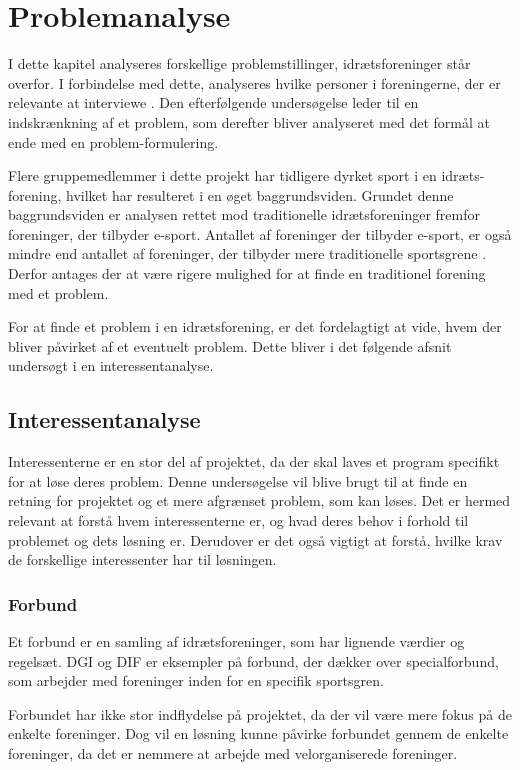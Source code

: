 \chapter{Problemanalyse}\label{ch:ch2label}
I dette kapitel analyseres forskellige problemstillinger, idrætsforeninger står overfor. I forbindelse med dette, analyseres hvilke personer i foreningerne, der er relevante at interviewe . Den efterfølgende undersøgelse leder til en indskrænkning af et problem, som derefter bliver analyseret med det formål at ende med en problem-formulering.
\par
Flere gruppemedlemmer i dette projekt har tidligere dyrket sport i en idræts-forening, hvilket har resulteret i en øget baggrundsviden. Grundet denne baggrundsviden er analysen rettet mod traditionelle idrætsforeninger fremfor foreninger, der tilbyder e-sport. Antallet af foreninger der tilbyder e-sport, er også mindre end antallet af foreninger, der tilbyder mere traditionelle sportsgrene \citep{e-sport}. Derfor antages der at være rigere mulighed for at finde en traditionel forening med et problem.
\par
For at finde et problem i en idrætsforening, er det fordelagtigt at vide, hvem der bliver påvirket af et eventuelt problem. Dette bliver i det følgende afsnit undersøgt i en interessentanalyse.
\newpage

\section{Interessentanalyse}
Interessenterne er en stor del af projektet, da der skal laves et program specifikt for at løse deres problem. Denne undersøgelse vil blive brugt til at finde en retning for projektet og et mere afgrænset problem, som kan løses. Det er hermed relevant at forstå hvem interessenterne er, og hvad deres behov i forhold til problemet og dets løsning er. Derudover er det også vigtigt at forstå, hvilke krav de forskellige interessenter har til løsningen.

\subsection*{Forbund}
Et forbund er en samling af idrætsforeninger, som har lignende værdier og regelsæt. DGI og DIF er eksempler på forbund, der dækker over specialforbund, som arbejder med foreninger inden for en specifik sportsgren.
\par
Forbundet har ikke stor indflydelse på projektet, da der vil være mere fokus på de enkelte foreninger. Dog vil en løsning kunne påvirke forbundet gennem de enkelte foreninger, da det er nemmere at arbejde med velorganiserede foreninger. 

